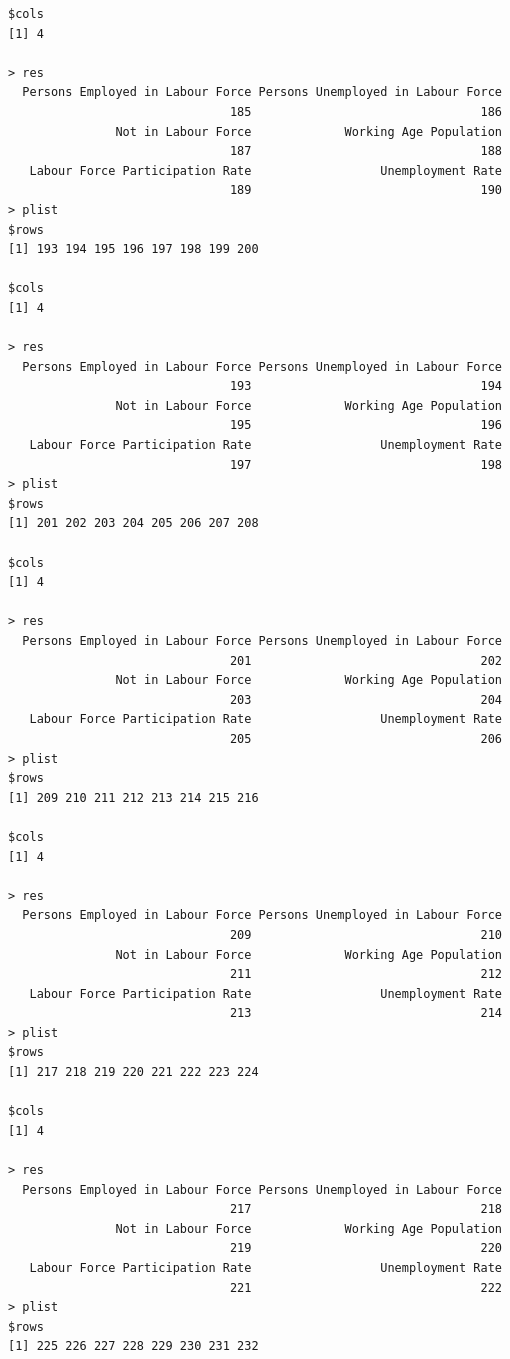 \documentclass[a4paper]{article}
\begin{document}
\begin{verbatim}
$cols
[1] 4

> res 
  Persons Employed in Labour Force Persons Unemployed in Labour Force 
                               185                                186 
               Not in Labour Force             Working Age Population 
                               187                                188 
   Labour Force Participation Rate                  Unemployment Rate 
                               189                                190 
> plist 
$rows
[1] 193 194 195 196 197 198 199 200

$cols
[1] 4

> res 
  Persons Employed in Labour Force Persons Unemployed in Labour Force 
                               193                                194 
               Not in Labour Force             Working Age Population 
                               195                                196 
   Labour Force Participation Rate                  Unemployment Rate 
                               197                                198 
> plist 
$rows
[1] 201 202 203 204 205 206 207 208

$cols
[1] 4

> res 
  Persons Employed in Labour Force Persons Unemployed in Labour Force 
                               201                                202 
               Not in Labour Force             Working Age Population 
                               203                                204 
   Labour Force Participation Rate                  Unemployment Rate 
                               205                                206 
> plist 
$rows
[1] 209 210 211 212 213 214 215 216

$cols
[1] 4

> res 
  Persons Employed in Labour Force Persons Unemployed in Labour Force 
                               209                                210 
               Not in Labour Force             Working Age Population 
                               211                                212 
   Labour Force Participation Rate                  Unemployment Rate 
                               213                                214 
> plist 
$rows
[1] 217 218 219 220 221 222 223 224

$cols
[1] 4

> res 
  Persons Employed in Labour Force Persons Unemployed in Labour Force 
                               217                                218 
               Not in Labour Force             Working Age Population 
                               219                                220 
   Labour Force Participation Rate                  Unemployment Rate 
                               221                                222 
> plist 
$rows
[1] 225 226 227 228 229 230 231 232


\end{verbatim}
\end{document}
